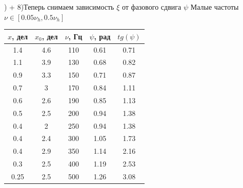 \documentclass[a4paper,12pt]{extarticle}
\begin{document}
) + 8)Теперь снимаем зависимость $\xi$ от фазового сдвига $\psi$
Малые частоты $\nu \in [0.05\nu_h, 0.5\nu_h]$ \\
\begin{tabular}{|c|c|c|c|c|}
\hline
$x$, дел    & $x_0$, дел & $\nu$, Гц  & $\psi$, рад & $tg(\psi)$       \\ \hline
1.4  & 4.6  & 110 & 0.61                     & 0.71                        \\ \hline
1.1  & 3.9  & 130 & 0.68                     & 0.82                        \\ \hline
0.9  & 3.3  & 150 & 0.71                     & 0.87                        \\ \hline
0.7  & 3    & 170 & 0.84                     & 1.11                        \\ \hline
0.6  & 2.6  & 190 & 0.85                     & 1.13                        \\ \hline
0.5  & 2.5  & 200 & 0.94                     & 1.38                        \\ \hline
0.4  & 2    & 250 & 0.94                     & 1.38                        \\ \hline
0.4  & 2.4  & 300 & 1.05                     & 1.73                        \\ \hline
0.4  & 2.9  & 350 & 1.14                     & 2.16                        \\ \hline
0.3  & 2.5  & 400 & 1.19                     & 2.53                        \\ \hline
0.25 & 2.5  & 500 & 1.26                     & 3.08                        \\ \hline
\end{tabular}
\begin{minipage}{1\textwidth}
\end{minipage}\\
\end{document}
